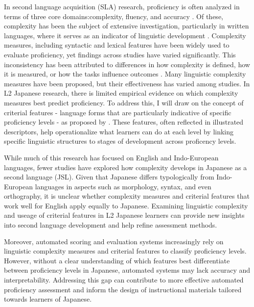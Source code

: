 In second language acquisition (SLA) research, proficiency is often analyzed in terms of three core
domains:complexity, fluency, and accuracy \cite{Skehan1989}. Of these, complexity has been the subject of extensive
investigation, particularly in written languages, where it serves as an indicator of linguistic development
\cite{Lu2010, Lu2011, Ortega2003, Iwashita2006}. Complexity measures, including syntactic and lexical features have
been widely used to evaluate proficiency, yet findings across studies have varied significantly. This inconsistency
has been attributed to differences in how complexity is defined, how it is measured, or how the tasks influence
outcomes \cite{Butle2012}. Many linguistic complexity measures have been proposed, but their effectiveness has
varied among studies. In L2 Japanese research, there is limited empirical evidence on which complexity measures best
predict proficiency.  To address this, I will draw on the concept of criterial features - language forms that are
particularly indicative of specific proficiency levels - as proposed by \cite{Hawkins_Buttery_2010}. These features,
often reflected in illustrated descriptors, help operationalize what learners can do at each level by linking
specific linguistic structures to stages of development across proficency levels.

While much of this research has focused on English and Indo-European languages, fewer studies have explored how
complexity develops in Japanese as a second language (JSL). Given that Japanese differs typologically from
Indo-European languages in aspects such as morphology, syntax, and even orthography, it is unclear whether
complexity measures and criterial features that work well for English apply equally to Japanese. Examining linguistic
complexity and useage of criterial features in L2
Japanese learners can provide new insights into second language development and help refine assessment methods.

Moreover, automated scoring and evaluation systems increasingly rely on linguistic complexity measures and
criterial features to classify
proficiency levels. However, without a clear understanding of which features best differentiate between
proficiency levels in Japanese, automated systems may lack accuracy and interpretability. Addressing this gap can
contribute to more effective automated proficiency assessment and inform the design of instructional materials
tailored towards learners of Japanese.

